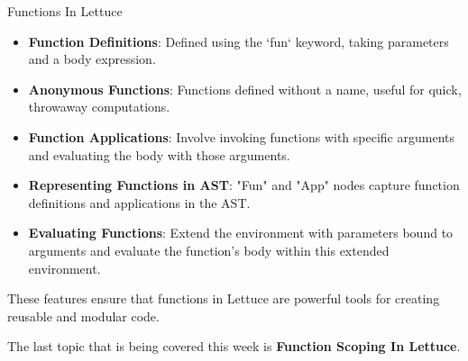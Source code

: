 \begin{notes}{Functions In Lettuce}
\begin{highlight}
        \begin{itemize}
            \item \textbf{Function Definitions}: Defined using the `fun` keyword, taking parameters and a body expression.
            \item \textbf{Anonymous Functions}: Functions defined without a name, useful for quick, throwaway computations.
            \item \textbf{Function Applications}: Involve invoking functions with specific arguments and evaluating the body with those arguments.
            \item \textbf{Representing Functions in AST}: "Fun" and "App" nodes capture function definitions and applications in the AST.
            \item \textbf{Evaluating Functions}: Extend the environment with parameters bound to arguments and evaluate the function's body within this extended environment.
        \end{itemize}
    
        These features ensure that functions in Lettuce are powerful tools for creating reusable and modular code.
    
    \end{highlight}
\end{notes}

The last topic that is being covered this week is \textbf{Function Scoping In Lettuce}.

